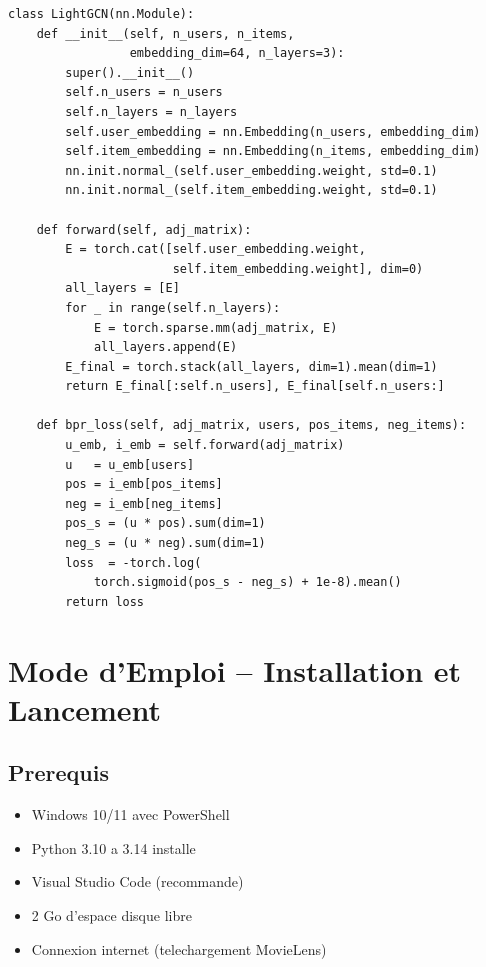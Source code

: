\documentclass[12pt,a4paper]{report}
\begin{document}
\begin{lstlisting}[caption={LightGCN en PyTorch -- propagation pure},
  label=lst:model]
class LightGCN(nn.Module):
    def __init__(self, n_users, n_items,
                 embedding_dim=64, n_layers=3):
        super().__init__()
        self.n_users = n_users
        self.n_layers = n_layers
        self.user_embedding = nn.Embedding(n_users, embedding_dim)
        self.item_embedding = nn.Embedding(n_items, embedding_dim)
        nn.init.normal_(self.user_embedding.weight, std=0.1)
        nn.init.normal_(self.item_embedding.weight, std=0.1)

    def forward(self, adj_matrix):
        E = torch.cat([self.user_embedding.weight,
                       self.item_embedding.weight], dim=0)
        all_layers = [E]
        for _ in range(self.n_layers):
            E = torch.sparse.mm(adj_matrix, E)
            all_layers.append(E)
        E_final = torch.stack(all_layers, dim=1).mean(dim=1)
        return E_final[:self.n_users], E_final[self.n_users:]

    def bpr_loss(self, adj_matrix, users, pos_items, neg_items):
        u_emb, i_emb = self.forward(adj_matrix)
        u   = u_emb[users]
        pos = i_emb[pos_items]
        neg = i_emb[neg_items]
        pos_s = (u * pos).sum(dim=1)
        neg_s = (u * neg).sum(dim=1)
        loss  = -torch.log(
            torch.sigmoid(pos_s - neg_s) + 1e-8).mean()
        return loss
\end{lstlisting}

\chapter{Mode d'Emploi -- Installation et Lancement}

\section{Prerequis}

\begin{itemize}
  \item Windows 10/11 avec PowerShell
  \item Python 3.10 a 3.14 installe
  \item Visual Studio Code (recommande)
  \item 2 Go d'espace disque libre
  \item Connexion internet (telechargement MovieLens)
\end{itemize}
\end{document}
